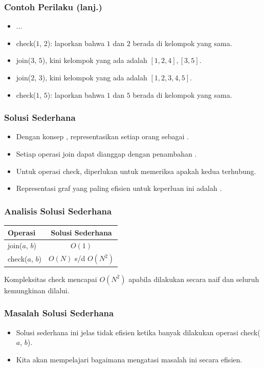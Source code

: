 \begin{frame}
\frametitle{Contoh Perilaku (lanj.)}
\begin{itemize}
  \item ...
  \item check($1$, $2$): laporkan bahwa $1$ dan $2$ berada di kelompok yang sama.
  \item join($3$, $5$), kini kelompok yang ada adalah $[1, 2, 4], [3, 5]$.
  \item join($2$, $3$), kini kelompok yang ada adalah $[1, 2, 3, 4, 5]$.
  \item check($1$, $5$): laporkan bahwa $1$ dan $5$ berada di kelompok yang sama.
\end{itemize}
\end{frame}

\begin{frame}
\frametitle{Solusi Sederhana}
\begin{itemize}
  \item Dengan konsep \fgraph, representasikan setiap orang sebagai \fnode.
  \item Setiap operasi join dapat dianggap dengan penambahan \fedge.
  \item Untuk operasi check, diperlukan \fgraphtraversal untuk memeriksa apakah kedua \fnode terhubung.
  \item Representasi graf yang paling efisien untuk keperluan ini adalah \fadjacencylist.
\end{itemize}
\end{frame}

\begin{frame}
\frametitle{Analisis Solusi Sederhana}
\begin{table}[ht]
  \begin{tabular}{|l|c|}
    \hline Operasi  & Solusi Sederhana \\
    \hline  join($a$, $b$) & $O(1)$  \\
    \hline  check($a$, $b$) & $O(N)$ s/d $O(N^2)$\\
    \hline
  \end{tabular}
\end{table}  
Kompleksitas check mencapai $O(N^2)$ apabila \fgraphtraversal dilakukan secara naif dan seluruh kemungkinan \fedge dilalui.
\end{frame}

\begin{frame}
\frametitle{Masalah Solusi Sederhana}
\begin{itemize}
  \item Solusi sederhana ini jelas tidak efisien ketika banyak dilakukan operasi check($a$, $b$).
  \item Kita akan mempelajari bagaimana \pdjs mengatasi masalah ini secara efisien.
\end{itemize}
\end{frame}

